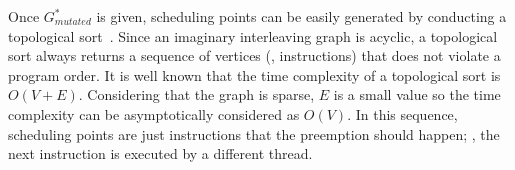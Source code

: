 %
Once $G^{*}_{mutated}$ is given, scheduling points can be easily
generated by conducting a topological sort~\cite{topologicalsort}.
%
Since an imaginary interleaving graph is acyclic, a topological sort
always returns a sequence of vertices (\ie, instructions) that does
not violate a program order.
%
It is well known that the time complexity of a topological sort is
$O(V+E)$. Considering that the graph is sparse, $E$ is a small value
so the time complexity can be asymptotically considered as $O(V)$.
%
In this sequence, scheduling points are just instructions that the
preemption should happen; \ie, the next instruction is executed by a
different thread.




